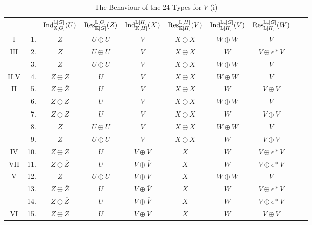 \begin{table}[p] %
    \vspace{4cm}
\centering
\bgroup
\caption{The Behaviour of the 24 Types for $V$ (i)}
\label{tab:24types2}
\def\arraystretch{1.1}
\begin{tabular}{c r c c c c c c c c}
    \toprule
    & & $\operatorname{Ind}_{{\mathbb K}[G]}^{{\mathbb L}[G]}(U)$ & $\Res_{\bK[G]}^{\bL[G]}(Z)$ & $\operatorname{Ind}_{{\mathbb K}[H]}^{{\mathbb L}[H]}(X)$ & $\Res_{\bK[H]}^{\bL[H]}(V)$ & $\operatorname{Ind}_{{\mathbb L}[H]}^{{\mathbb L}_{\star \hspace{-0.1em}}[G]}(V)$ & $\Res_{\bL[H]}^{\bL_{\star \hspace{-0.1em}}[G]}(W)$ \\
    \midrule
I & 1.  &  $Z$ & $U \oplus U$ & $V$ & $X \oplus X$ & $W \oplus W$ & $V$ \\ 
III & 2.  &  $Z$ & $U \oplus U$ & $V$ & $X \oplus X$ & $W$ & $V \oplus \epsilon * V$  \\ 
& 3.  &  $Z$ & $U \oplus U$ & $V$ & $X \oplus X$ & $W \oplus W$ & $V$  \\ 
II.V & 4.  &  $Z \oplus \overline{Z}$ & $U$ & $V$ & $X \oplus X$ & $W \oplus W$ & $V$  \\ 
II & 5.  &  $Z \oplus \overline{Z}$ & $U$ & $V$ & $X \oplus X$ & $W$ & $V \oplus V$  \\ 
& 6.  &  $Z \oplus Z$ & $U$ & $V$ & $X \oplus X$ & $W \oplus W$ & $V$  \\ 
& 7.  &  $Z \oplus Z$ & $U$ & $V$ & $X \oplus X$ & $W$ & $V \oplus V$ \\ 
& 8.  &  $Z$ & $U \oplus U$ & $V$ & $X \oplus X$ & $W \oplus W$ & $V$ \\ 
& 9.  &  $Z$ & $U \oplus U$ & $V$ & $X \oplus X$ & $W$ & $V \oplus V$  \\ 
IV & 10. &  $Z \oplus \overline{Z}$ & $U$ & $V \oplus \overline{V}$ & $X$ & $W$ & $V \oplus \epsilon * V$  \\ 
VII & 11. &  $Z \oplus \overline{Z}$ & $U$ & $V \oplus \overline{V}$ & $X$ & $W$ & $V \oplus \epsilon * V$  \\ 
V & 12. &  $Z$ & $U \oplus U$ & $V \oplus \overline{V}$ & $X$ & $W \oplus W$ & $V$ \\ 
& 13. &  $Z \oplus \overline{Z}$ & $U$ & $V \oplus \overline{V}$ & $X$ & $W$ & $V \oplus \epsilon * V$  \\ 
& 14. &  $Z \oplus \overline{Z}$ & $U$ & $V \oplus \overline{V}$ & $X$ & $W$ & $V \oplus \epsilon * V$  \\ 
VI & 15. &  $Z \oplus Z$ & $U$ & $V \oplus \overline{V}$ & $X$ & $W$ & $V \oplus V$ \\ 

\end{tabular}
\end{table}
